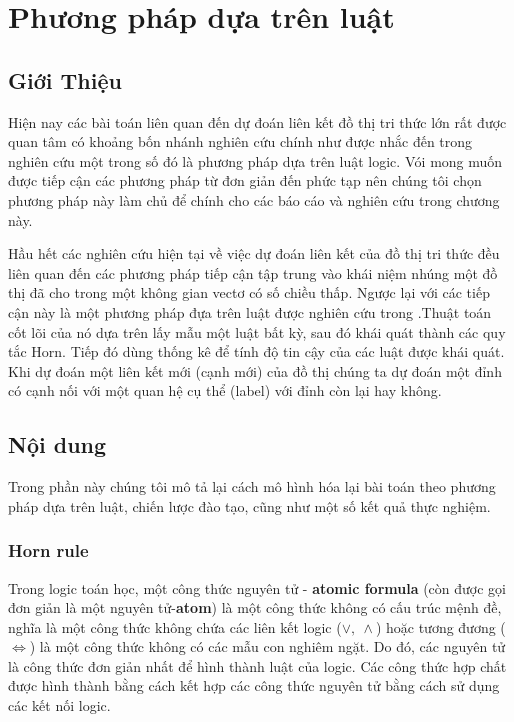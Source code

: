 \chapter{Phương pháp dựa trên luật}
\label{Chapter2}

\section{Giới Thiệu}

Hiện nay các bài toán liên quan đến dự đoán liên kết đồ thị tri thức lớn rất được quan tâm có khoảng bốn nhánh nghiên cứu chính như được nhắc đến trong nghiên cứu \cite{ampligraph} một trong số đó là phương pháp dựa trên luật logic. Vói mong muốn được tiếp cận các phương pháp từ đơn giản đến phức tạp nên chúng tôi chọn phương pháp này làm chủ để chính cho các báo cáo và nghiên cứu trong chương này.

Hầu hết các nghiên cứu hiện tại về việc dự đoán liên kết của đồ thị tri thức đều liên quan đến các phương pháp tiếp cận tập trung vào khái niệm nhúng một đồ thị đã cho trong một không gian vectơ có số chiều thấp. Ngược lại với các tiếp cận này là một phương pháp đựa trên luật được nghiên cứu trong \cite{burl}.Thuật toán cốt lõi của nó dựa trên lấy mẫu một luật bất kỳ, sau đó khái quát  thành các quy tắc Horn. Tiếp đó dùng thống kê để tính độ tin cậy của các luật được khái quát. Khi dự đoán một liên kết mới (cạnh mới) của đồ thị chúng ta dự đoán một đỉnh có cạnh nối với một quan hệ cụ thể (label) với đỉnh còn lại hay không.

\section{Nội dung}
Trong phần này chúng tôi mô tả lại cách mô hình hóa lại bài toán theo phương pháp dựa trên luật, chiến lược đào tạo, cũng như một số kết quả thực nghiệm.
\subsection{Horn rule}
Trong logic toán học, một công thức nguyên tử - \textbf{atomic formula}\cite{wiki:Atomic} (còn được gọi đơn giản là một nguyên tử-\textbf{atom}) là một công thức không có cấu trúc mệnh đề, nghĩa là một công thức không chứa các liên kết logic (\(\vee, ~ \wedge\)) hoặc tương đương (\(\Leftrightarrow\)) là một công thức không có các mẫu con nghiêm ngặt. Do đó, các nguyên tử là công thức đơn giản nhất để hình thành luật của logic. Các công thức hợp chất được hình thành bằng cách kết hợp các công thức nguyên tử bằng cách sử dụng các kết nối logic.

